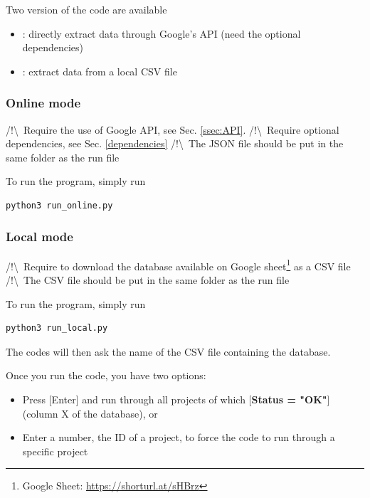 Two version of the code are available
\begin{itemize}
    \item {}: directly extract data through Google's API (need the optional dependencies)
    \item {}: extract data from a local CSV file 
\end{itemize}

\begin{multicols}{2}
    \raggedcolumns
    \subsubsection*{Online mode}
    
        /!\textbackslash \ Require the use of Google API, see Sec. \ref{ssec:API}.\newline
        /!\textbackslash \ Require optional dependencies, see Sec. \ref{dependencies}\newline
        /!\textbackslash \ The JSON file should be put in the same folder as the run file
        
        To run the program, simply run
        \begin{lstlisting}[language=Python]
        python3 run_online.py\end{lstlisting}
    \columnbreak
    \subsubsection*{Local mode}
    
        /!\textbackslash \ Require to download the database available on Google sheet\footnote{Google Sheet: \href{https://docs.google.com/spreadsheets/d/1x_SdxdlHwG8chH77WqrTAAgijY2XBY3nPIi2p3TKqzs/edit?gid=1297224389\#gid=1297224389}{https://shorturl.at/sHBrz}} as a CSV file\newline
        /!\textbackslash \ The CSV file should be put in the same folder as the run file
    
        To run the program, simply run
        \begin{lstlisting}[language=Python]
        python3 run_local.py\end{lstlisting}
    
        The codes will then ask the name of the CSV file containing the database.
\end{multicols}

Once you run the code, you have two options:
\begin{itemize}
    \item Press [Enter] and run through all projects of which [\textbf{Status = "OK"}] (column X of the database), or
    \item Enter a number, the ID of a project, to force the code to run through a specific project
\end{itemize}

